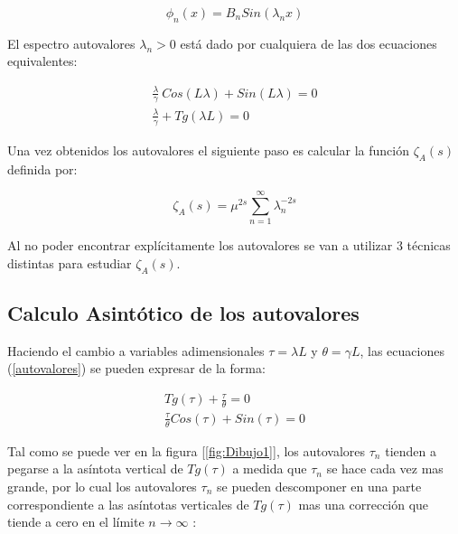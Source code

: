 \begin{equation}
\phi _n (x) = 
B _n Sin( \lambda _n x )
\end{equation}

El espectro autovalores $\lambda _n > 0 $ está dado por  cualquiera de las dos ecuaciones equivalentes: 

\begin{equation}
\begin{array}{cc}
    \frac{\lambda}{\gamma}  \ Cos( L \lambda ) +   Sin( L \lambda ) = 0 \\[5pt]
    \frac{\lambda}{\gamma}  + Tg(\lambda L )  = 0 
\label{autovalores}
\end{array}
\end{equation}



Una vez obtenidos los autovalores el siguiente paso es calcular la función $\zeta _A (s) $ definida por:

\begin{equation}
    \zeta _ {A } (s) = \mu ^{2s} \sum_{n = 1} ^{ \infty } \lambda _n ^ {-2 s}
\end{equation}

Al no poder encontrar explícitamente los autovalores se van a utilizar 3 técnicas distintas para estudiar $\zeta _A (s)$.

\subsection{Calculo Asintótico de los autovalores}


Haciendo el cambio a variables adimensionales $\tau = \lambda L $ y $\theta = \gamma L $, las ecuaciones (\ref{autovalores}) se pueden expresar de la forma:

\begin{equation}
\begin{array}{c}
    Tg(\tau) + \frac{\tau}{\theta} = 0 \\[5pt]
    \frac{\tau}{\theta} Cos( \tau ) + Sin( \tau ) = 0
\end{array}
\label{eq.asintota}
\end{equation}

Tal como se puede ver en la figura [\ref{fig:Dibujo1}], los autovalores $\tau _n$ tienden a pegarse a la asíntota vertical de $ Tg ( \tau ) $ a medida que $\tau _n$ se hace cada vez mas grande, por lo cual los autovalores $\tau _n$ se pueden descomponer en una parte correspondiente a las asíntotas verticales de $Tg( \tau )$ mas una corrección que tiende a cero en el límite $ n  \rightarrow \infty$ :

